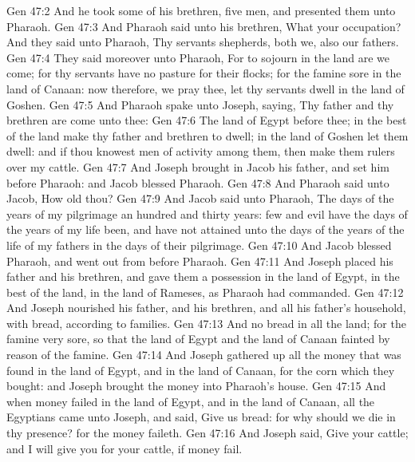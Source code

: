 \vs Gen 47:2 And he took some of his brethren,  five men, and presented them unto Pharaoh.
\vs Gen 47:3 And Pharaoh said unto his brethren, What  your occupation? And they said unto Pharaoh, Thy servants  shepherds, both we,  also our fathers.
\vs Gen 47:4 They said moreover unto Pharaoh, For to sojourn in the land are we come; for thy servants have no pasture for their flocks; for the famine  sore in the land of Canaan: now therefore, we pray thee, let thy servants dwell in the land of Goshen.
\vs Gen 47:5 And Pharaoh spake unto Joseph, saying, Thy father and thy brethren are come unto thee:
\vs Gen 47:6 The land of Egypt  before thee; in the best of the land make thy father and brethren to dwell; in the land of Goshen let them dwell: and if thou knowest  men of activity among them, then make them rulers over my cattle.
\vs Gen 47:7 And Joseph brought in Jacob his father, and set him before Pharaoh: and Jacob blessed Pharaoh.
\vs Gen 47:8 And Pharaoh said unto Jacob, How old  thou?
\vs Gen 47:9 And Jacob said unto Pharaoh, The days of the years of my pilgrimage  an hundred and thirty years: few and evil have the days of the years of my life been, and have not attained unto the days of the years of the life of my fathers in the days of their pilgrimage.
\vs Gen 47:10 And Jacob blessed Pharaoh, and went out from before Pharaoh.
\vs Gen 47:11 And Joseph placed his father and his brethren, and gave them a possession in the land of Egypt, in the best of the land, in the land of Rameses, as Pharaoh had commanded.
\vs Gen 47:12 And Joseph nourished his father, and his brethren, and all his father's household, with bread, according to  families.
\vs Gen 47:13 And  no bread in all the land; for the famine  very sore, so that the land of Egypt and  the land of Canaan fainted by reason of the famine.
\vs Gen 47:14 And Joseph gathered up all the money that was found in the land of Egypt, and in the land of Canaan, for the corn which they bought: and Joseph brought the money into Pharaoh's house.
\vs Gen 47:15 And when money failed in the land of Egypt, and in the land of Canaan, all the Egyptians came unto Joseph, and said, Give us bread: for why should we die in thy presence? for the money faileth.
\vs Gen 47:16 And Joseph said, Give your cattle; and I will give you for your cattle, if money fail.
